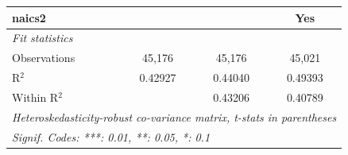 \begin{tabular}{lccc}
   naics2        &                   &                   & Yes\\  
   \midrule
   \emph{Fit statistics}\\
   Observations  & 45,176            & 45,176            & 45,021\\  
   R$^2$         & 0.42927           & 0.44040           & 0.49393\\  
   Within R$^2$  &                   & 0.43206           & 0.40789\\  
   \midrule \midrule
   \multicolumn{4}{l}{\emph{Heteroskedasticity-robust co-variance matrix, t-stats in parentheses}}\\
   \multicolumn{4}{l}{\emph{Signif. Codes: ***: 0.01, **: 0.05, *: 0.1}}\\
\end{tabular}
\par\endgroup


